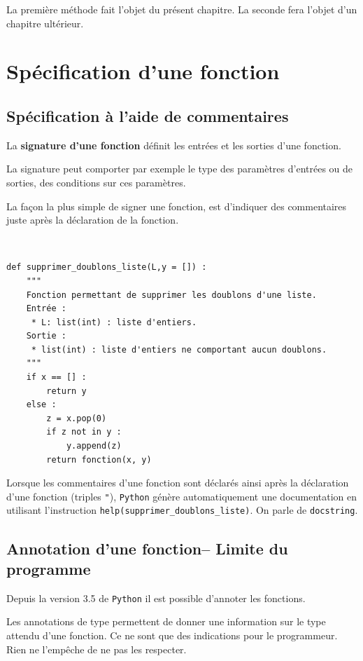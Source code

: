 La première méthode fait l'objet du présent chapitre. La seconde fera l'objet d'un chapitre ultérieur. 




\section{Spécification d'une fonction}

\subsection{Spécification à l'aide de commentaires}
\begin{defi}
La \textbf{signature d'une fonction} définit les entrées et les sorties d'une fonction. 
\end{defi}

La signature peut comporter par exemple le type  des paramètres d'entrées ou de sorties, des conditions sur ces paramètres. 

La façon la plus simple de signer une fonction, est d'indiquer des commentaires juste après la déclaration de la fonction. 

\begin{exemple}~\\
\begin{lstlisting}
def supprimer_doublons_liste(L,y = []) :
    """
    Fonction permettant de supprimer les doublons d'une liste.
    Entrée : 
     * L: list(int) : liste d'entiers. 
    Sortie : 
     * list(int) : liste d'entiers ne comportant aucun doublons.
    """
    if x == [] : 
        return y
    else : 
        z = x.pop(0)
        if z not in y : 
            y.append(z)
        return fonction(x, y)
\end{lstlisting}

Lorsque les commentaires d'une fonction sont déclarés ainsi après la déclaration d'une fonction (triples \texttt{"}), \texttt{Python} génère automatiquement une documentation en utilisant l'instruction \texttt{help(supprimer\_doublons\_liste)}. On parle de \texttt{docstring}.
\end{exemple}


\subsection{Annotation d'une fonction-- Limite du programme}

Depuis la version 3.5 de \texttt{Python} il est possible d'annoter les fonctions. 
\begin{defi} Les annotations de type permettent de donner une information sur le type attendu d'une fonction. Ce ne sont que des indications pour le programmeur. Rien ne l'empêche de ne pas les respecter. 
\end{defi}

